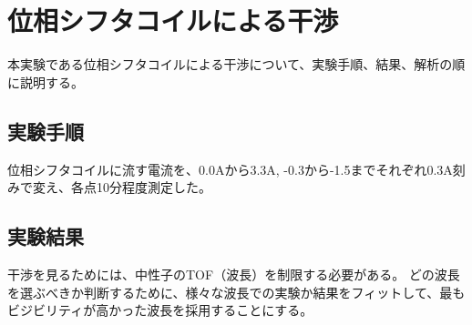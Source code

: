 \begingroup
\def\imgwidth{5.5cm}

\section{位相シフタコイルによる干渉}\label{phase_shifter_sec}
本実験である位相シフタコイルによる干渉について、実験手順、結果、解析の順に説明する。

\subsection{実験手順}
位相シフタコイルに流す電流を、0.0Aから3.3A, -0.3から-1.5までそれぞれ0.3A刻みで変え、各点10分程度測定した。

\subsection{実験結果}
干渉を見るためには、中性子のTOF（波長）を制限する必要がある。
どの波長を選ぶべきか判断するために、様々な波長での実験か結果をフィットして、最もビジビリティが高かった波長を採用することにする。

